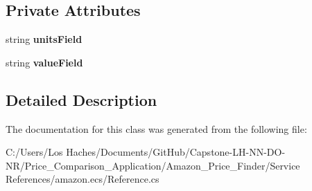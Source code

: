 \subsection*{Private Attributes}
\begin{DoxyCompactItemize}
\item 
\hypertarget{class_price___comparison_1_1amazon_1_1ecs_1_1_non_negative_integer_with_units_ac042545927edf899e0e058620523b0a9}{string {\bfseries units\-Field}}\label{class_price___comparison_1_1amazon_1_1ecs_1_1_non_negative_integer_with_units_ac042545927edf899e0e058620523b0a9}

\item 
\hypertarget{class_price___comparison_1_1amazon_1_1ecs_1_1_non_negative_integer_with_units_a9453647996e723b0048d6f19d13f17b1}{string {\bfseries value\-Field}}\label{class_price___comparison_1_1amazon_1_1ecs_1_1_non_negative_integer_with_units_a9453647996e723b0048d6f19d13f17b1}

\end{DoxyCompactItemize}


\subsection{Detailed Description}


The documentation for this class was generated from the following file\-:\begin{DoxyCompactItemize}
\item 
C\-:/\-Users/\-Los Haches/\-Documents/\-Git\-Hub/\-Capstone-\/\-L\-H-\/\-N\-N-\/\-D\-O-\/\-N\-R/\-Price\-\_\-\-Comparison\-\_\-\-Application/\-Amazon\-\_\-\-Price\-\_\-\-Finder/\-Service References/amazon.\-ecs/Reference.\-cs\end{DoxyCompactItemize}
